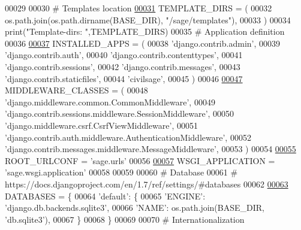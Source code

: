 \begin{DoxyCode}
00029 
00030 \textcolor{comment}{#  Templates location}
\hypertarget{settings_8py_source_l00031}{}\hyperlink{namespacesage_1_1settings_addc90c15790d385d304972f1b3098a86}{00031} TEMPLATE\_DIRS = (
00032     os.path.join(os.path.dirname(BASE\_DIR), \textcolor{stringliteral}{"/sage/templates"}),
00033 )
00034 print(\textcolor{stringliteral}{"Template-dirs: "},TEMPLATE\_DIRS)
00035 \textcolor{comment}{# Application definition}
00036 
\hypertarget{settings_8py_source_l00037}{}\hyperlink{namespacesage_1_1settings_af48e999a4a4e7f8830d84ac4eb08df1a}{00037} INSTALLED\_APPS = (
00038     \textcolor{stringliteral}{'django.contrib.admin'},
00039     \textcolor{stringliteral}{'django.contrib.auth'},
00040     \textcolor{stringliteral}{'django.contrib.contenttypes'},
00041     \textcolor{stringliteral}{'django.contrib.sessions'},
00042     \textcolor{stringliteral}{'django.contrib.messages'},
00043     \textcolor{stringliteral}{'django.contrib.staticfiles'},
00044     \textcolor{stringliteral}{'civilsage'},
00045 )
00046 
\hypertarget{settings_8py_source_l00047}{}\hyperlink{namespacesage_1_1settings_a247a0ea3c79f999897dbfaed3bc99b1d}{00047} MIDDLEWARE\_CLASSES = (
00048     \textcolor{stringliteral}{'django.middleware.common.CommonMiddleware'},
00049     \textcolor{stringliteral}{'django.contrib.sessions.middleware.SessionMiddleware'},
00050     \textcolor{stringliteral}{'django.middleware.csrf.CsrfViewMiddleware'},
00051     \textcolor{stringliteral}{'django.contrib.auth.middleware.AuthenticationMiddleware'},
00052     \textcolor{stringliteral}{'django.contrib.messages.middleware.MessageMiddleware'},
00053 )
00054 
\hypertarget{settings_8py_source_l00055}{}\hyperlink{namespacesage_1_1settings_a92b3d804acae3871a9877ad143df4201}{00055} ROOT\_URLCONF = \textcolor{stringliteral}{'sage.urls'}
00056 
\hypertarget{settings_8py_source_l00057}{}\hyperlink{namespacesage_1_1settings_a700b653427cc28bc1ebe951b419cfd58}{00057} WSGI\_APPLICATION = \textcolor{stringliteral}{'sage.wsgi.application'}
00058 
00059 
00060 \textcolor{comment}{# Database}
00061 \textcolor{comment}{# https://docs.djangoproject.com/en/1.7/ref/settings/#databases}
00062 
\hypertarget{settings_8py_source_l00063}{}\hyperlink{namespacesage_1_1settings_a870c10acdd1141ac92340ce3e50ffbbd}{00063} DATABASES = \{
00064     \textcolor{stringliteral}{'default'}: \{
00065         \textcolor{stringliteral}{'ENGINE'}: \textcolor{stringliteral}{'django.db.backends.sqlite3'},
00066         \textcolor{stringliteral}{'NAME'}: os.path.join(BASE\_DIR, \textcolor{stringliteral}{'db.sqlite3'}),
00067     \}
00068 \}
00069 
00070 \textcolor{comment}{# Internationalization}

\end{DoxyCode}

